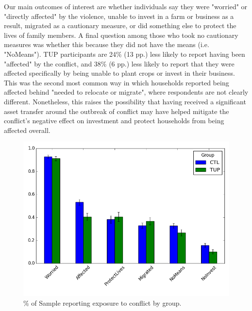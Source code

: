 \documentclass[12pt,article]{article}
\begin{document}
Our main outcomes of interest are whether individuals say they were "worried" or
"directly affected" by the violence, unable to invest in a farm or business as a
result, migrated as a cautionary measure, or did something else to protect the lives
of family members. A final question among those who took no cautionary measures was
whether this because they did not have the means (i.e. "NoMeans"). TUP participants
are 24\% (13 pp.) less likely to report having been "affected" by the conflict, and
38\% (6 pp.) less likely to report that they were affected specifically by being
unable to plant crops or invest in their business. This was the second most common
way in which households reported being affected behind "needed to relocate or
migrate", where respondents are not clearly different. Nonetheless, this raises the
possibility that having received a significant asset transfer around the outbreak of
conflict may have helped mitigate the conflict's negative effect on investment and
protect households from being affected overall.

\begin{figure}[htb]
\centering
\includegraphics[width=.9\linewidth]{../figures/conflict_exposure.png}
\caption{\label{fig:conflict_exposure}\% of Sample reporting exposure to conflict by group.}
\end{figure} 
\end{document}
